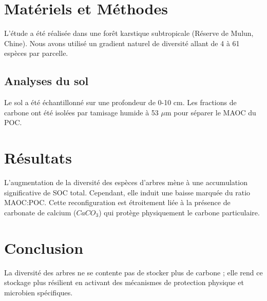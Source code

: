 \documentclass[11pt, a4paper]{article}
\begin{document}
\section{Matériels et Méthodes}
L'étude a été réalisée dans une forêt karstique subtropicale (Réserve de Mulun, Chine). Nous avons utilisé un gradient naturel de diversité allant de 4 à 61 espèces par parcelle.

\subsection{Analyses du sol}
Le sol a été échantillonné sur une profondeur de 0-10 cm. Les fractions de carbone ont été isolées par tamisage humide à 53 $\mu$m pour séparer le MAOC du POC.

\section{Résultats}
L'augmentation de la diversité des espèces d'arbres mène à une accumulation significative de SOC total. Cependant, elle induit une baisse marquée du ratio MAOC:POC. Cette reconfiguration est étroitement liée à la présence de carbonate de calcium ($CaCO_3$) qui protège physiquement le carbone particulaire.

\section{Conclusion}
La diversité des arbres ne se contente pas de stocker plus de carbone ; elle rend ce stockage plus résilient en activant des mécanismes de protection physique et microbien spécifiques.
\end{document}
